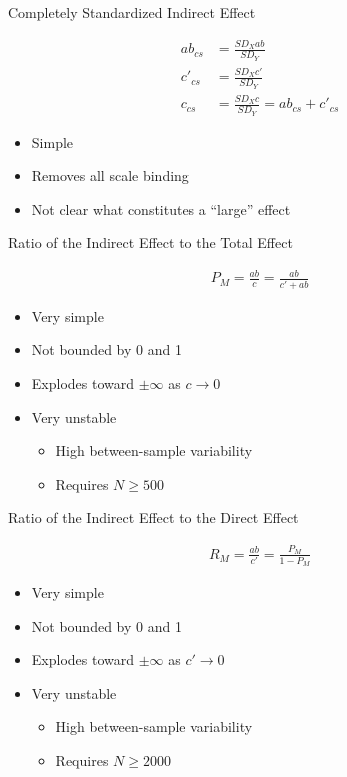 \documentclass{beamer}
\begin{document}
\begin{frame}{Completely Standardized Indirect Effect}
  
  \begin{align*}
    ab_{cs} &= \frac{SD_X ab}{SD_Y}\\
    c'_{cs} &= \frac{SD_X c'}{SD_Y}\\
    c_{cs} &= \frac{SD_X c}{SD_Y} = ab_{cs} + c'_{cs}
  \end{align*}
  
  \begin{itemize}
    \item Simple
    \item Removes all scale binding
    \item Not clear what constitutes a ``large'' effect
  \end{itemize}
  
\end{frame}


\begin{frame}{Ratio of the Indirect Effect to the Total Effect}
  
  \begin{align*}
    P_M = \frac{ab}{c} = \frac{ab}{c' + ab}
  \end{align*}
  
  \begin{itemize}
  \item Very simple
  \item Not bounded by 0 and 1
  \item Explodes toward $\pm \infty$ as $c\rightarrow 0$
  \item Very unstable
    \begin{itemize}
    \item High between-sample variability
    \item Requires $N \geq 500$
    \end{itemize}
  \end{itemize}
\end{frame}



\begin{frame}{Ratio of the Indirect Effect to the Direct Effect}
  
  \begin{align*}
    R_M = \frac{ab}{c'} = \frac{P_M}{1 - P_M}
  \end{align*}
  
  \begin{itemize}
  \item Very simple
  \item Not bounded by 0 and 1
  \item Explodes toward $\pm \infty$ as $c'\rightarrow 0$
  \item Very unstable
    \begin{itemize}
    \item High between-sample variability
    \item Requires $N \geq 2000$
    \end{itemize}
  \end{itemize}
  
\end{frame}
\end{document}
